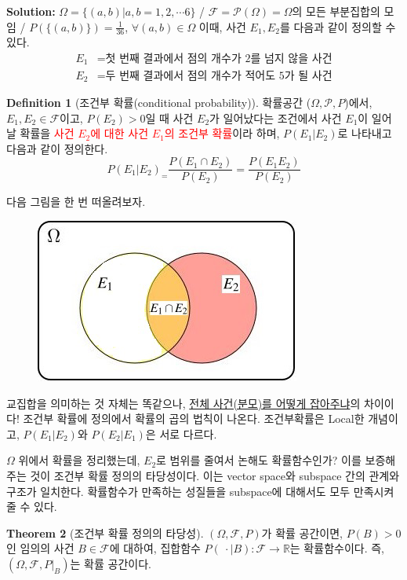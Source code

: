 \documentclass{article}
\theoremstyle{definition}
\newtheorem{theorem}{Theorem}
\newtheorem{definition}[theorem]{Definition}
\begin{document}
\noindent
\textbf{Solution:} $\Omega = \{ (a, b) | a, b = 1, 2, \cdots 6 \}$ / $\mathcal{F} = \mathcal{P} (\Omega) = \Omega$의 모든 부분집합의 모임 / $P(\{ (a,b) \} ) = \frac{1}{36}$, $\forall (a, b) \in \Omega$ 이때, 사건 $E_1, E_2$를 다음과 같이 정의할 수 있다.
\begin{align*}
    E_1 &= \text{첫 번째 결과에서 점의 개수가 2를 넘지 않을 사건}\\
    E_2 &= \text{두 번째 결과에서 점의 개수가 적어도 5가 될 사건}
\end{align*}

\begin{definition}[조건부 확률(conditional probability)]
    확률공간 ($\Omega, \mathcal{P}, P$)에서, $E_1, E_2 \in \mathcal{F}$이고, $P(E_2) > 0$일 때 사건 $E_2$가 일어났다는 조건에서 사건 $E_1$이 일어날 확률을 \textcolor{red}{사건 $E_2$에 대한 사건 $E_1$의 조건부 확률}이라 하며, $P(E_1 | E_2)$로 나타내고 다음과 같이 정의한다.
    \begin{equation*}
        P(E_1 | E_2)_ = \frac{P(E_1 \cap E_2)}{P(E_2)} = \frac{P(E_1 E_2)}{P(E_2)}
    \end{equation*}
\end{definition}

\noindent
다음 그림을 한 번 떠올려보자.
\begin{figure}[h]
    \centering
    \includegraphics[width = 0.3\linewidth]{image/fig1_1.png}
\end{figure}

\noindent
교집합을 의미하는 것 자체는 똑같으나, \underline{전체 사건(분모)를 어떻게 잡아주냐}의 차이이다! 조건부 확률에 정의에서 확률의 곱의 법칙이 나온다. 조건부확률은 Local한 개념이고, $P(E_1 | E_2)$와 $P(E_2 | E_1)$은 서로 다르다.

\noindent
$\Omega$ 위에서 확률을 정리했는데, $E_2$로 범위를 줄여서 논해도 확률함수인가? 이를 보증해주는 것이 조건부 확률 정의의 타당성이다. 이는 vector space와 subspace 간의 관계와 구조가 일치한다. 확률함수가 만족하는 성질들을 subspace에 대해서도 모두 만족시켜줄 수 있다.

\newpage

\begin{theorem}[조건부 확률 정의의 타당성]
    $(\Omega, \mathcal{F}, P)$가 확률 공간이면, $P(B) > 0$인 임의의 사건 $B \in \mathcal{F}$에 대하여, 집합함수 $P(\ \cdot \mid B) : \mathcal{F} \to \mathbb{R}$는 확률함수이다. 즉, $(\Omega, \mathcal{F}, P|_{B})$는 확률 공간이다.
\end{theorem}
\end{document}
